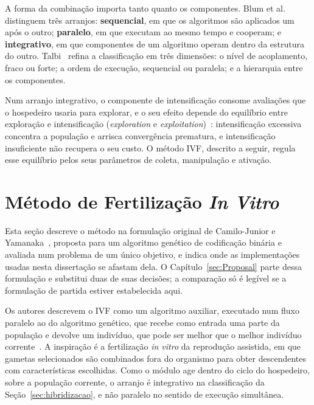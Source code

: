 A forma da combinação importa tanto quanto os componentes. Blum et al.~\cite{blum2011hybrid} distinguem três arranjos: \textbf{sequencial}, em que os algoritmos são aplicados um após o outro; \textbf{paralelo}, em que executam ao mesmo tempo e cooperam; e \textbf{integrativo}, em que componentes de um algoritmo operam dentro da estrutura do outro. Talbi~\cite{talbi2009metaheuristics} refina a classificação em três dimensões: o nível de acoplamento, fraco ou forte; a ordem de execução, sequencial ou paralela; e a hierarquia entre os componentes.

Num arranjo integrativo, o componente de intensificação consome avaliações que o hospedeiro usaria para explorar, e o seu efeito depende do equilíbrio entre exploração e intensificação (\textit{exploration} e \textit{exploitation})~\cite{talbi2009metaheuristics}: intensificação excessiva concentra a população e arrisca convergência prematura, e intensificação insuficiente não recupera o seu custo. O método IVF, descrito a seguir, regula esse equilíbrio pelos seus parâmetros de coleta, manipulação e ativação.

\section{Método de Fertilização \textit{In Vitro}}
\label{sec:ivf}

Esta seção descreve o método na formulação original de Camilo-Junior e Yamanaka~\cite{camilo-junior2011}, proposta para um algoritmo genético de codificação binária e avaliada num problema de um único objetivo, e indica onde as implementações usadas nesta dissertação se afastam dela. O Capítulo~\ref{sec:Proposal} parte dessa formulação e substitui duas de suas decisões; a comparação só é legível se a formulação de partida estiver estabelecida aqui.

Os autores descrevem o IVF como um algoritmo auxiliar, executado num fluxo paralelo ao do algoritmo genético, que recebe como entrada uma parte da população e devolve um indivíduo, que pode ser melhor que o melhor indivíduo corrente~\cite{camilo-junior2011}. A inspiração é a fertilização \textit{in vitro} da reprodução assistida, em que gametas selecionados são combinados fora do organismo para obter descendentes com características escolhidas. Como o módulo age dentro do ciclo do hospedeiro, sobre a população corrente, o arranjo é integrativo na classificação da Seção~\ref{sec:hibridizacao}, e não paralelo no sentido de execução simultânea.

